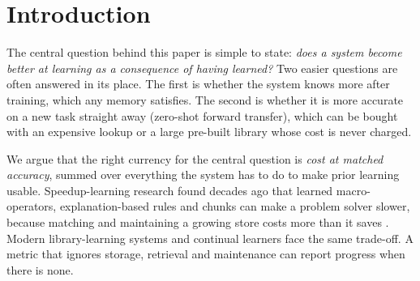 \documentclass[11pt]{article}
\theoremstyle{remark}
\begin{document}
\section{Introduction}\label{sec:intro}

The central question behind this paper is simple to state: \emph{does a system become better at learning as a consequence of having learned?}
Two easier questions are often answered in its place.
The first is whether the system knows more after training, which any memory satisfies.
The second is whether it is more accurate on a new task straight away (zero-shot forward transfer), which can be bought with an expensive lookup or a large pre-built library whose cost is never charged.

We argue that the right currency for the central question is \emph{cost at matched accuracy}, summed over everything the system has to do to make prior learning usable.
Speedup-learning research found decades ago that learned macro-operators, explanation-based rules and chunks can make a problem solver slower, because matching and maintaining a growing store costs more than it saves \citep{minton1990quantitative,tambe1990expensive}.
Modern library-learning systems \citep{ellis2021dreamcoder,bowers2023stitch,grand2024lilo} and continual learners face the same trade-off.
A metric that ignores storage, retrieval and maintenance can report progress when there is none.
\end{document}

